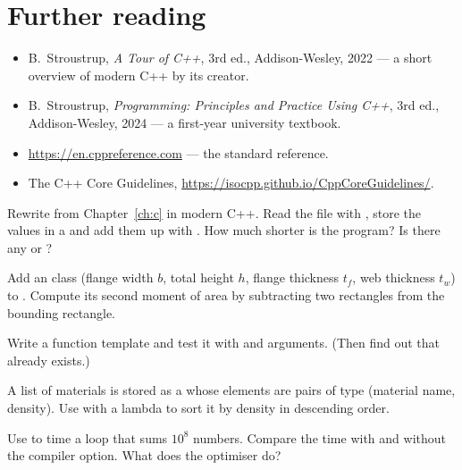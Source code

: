 \section{Further reading}
\begin{itemize}
\item B.~Stroustrup, \emph{A Tour of C++}, 3rd ed., Addison-Wesley, 2022 --- a short
  overview of modern C++ by its creator.
\item B.~Stroustrup, \emph{Programming: Principles and Practice Using C++}, 3rd ed.,
  Addison-Wesley, 2024 --- a first-year university textbook.
\item \url{https://en.cppreference.com} --- the standard reference.
\item The C++ Core Guidelines, \url{https://isocpp.github.io/CppCoreGuidelines/}.
\end{itemize}

\begin{exercises}
\item Rewrite  from Chapter~\ref{ch:c} in modern C++. Read the file with
  , store the values in a  and add them up with
  . How much shorter is the program? Is there any  or ?
\item Add an  class (flange width $b$, total height $h$, flange thickness
  $t_f$, web thickness $t_w$) to . Compute its second moment of area by
  subtracting two rectangles from the bounding rectangle.
\item Write a function template  and test it with
   and  arguments. (Then find out that  already
  exists.)
\item A list of materials is stored as a  whose elements are pairs of
  type  (material name, density). Use
   with a lambda to sort it by density in
  descending order.
\item Use  to time a loop that sums $10^8$ numbers. Compare the time with
  and without the  compiler option. What does the optimiser do?
\end{exercises}

